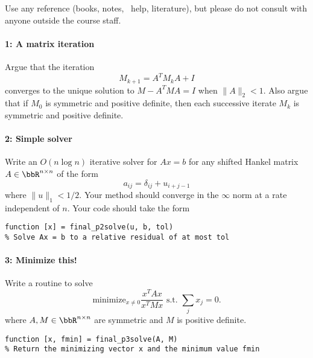 \documentclass[12pt, leqno]{article} %
\begin{document}

Use any reference (books, notes, \matlab\ help, literature),
but please do not consult with anyone outside the course staff.

\paragraph*{1: A matrix iteration}
Argue that the iteration
\[
  M_{k+1} = A^T M_k A + I
\]
converges to the unique solution to $M - A^T M A = I$ when $\|A\|_2 < 1$.
Also argue that if $M_0$ is symmetric and positive definite,
then each successive iterate $M_k$ is symmetric and positive definite.

\paragraph*{2: Simple solver}
Write an $O(n \log n)$ iterative solver for $Ax = b$
for any shifted Hankel matrix $A \in \bbR^{n \times n}$ of the form
\[
  a_{ij} = \delta_{ij} + u_{i+j-1}
\]
where $\|u\|_1 < 1/2$.  Your method should converge in the
$\infty$ norm at a rate independent of $n$.  Your code should
take the form
\begin{lstlisting}
function [x] = final_p2solve(u, b, tol)
% Solve Ax = b to a relative residual of at most tol
\end{lstlisting}

\paragraph*{3: Minimize this!}
Write a routine to solve
\[
  \mbox{minimize}_{x \neq 0} \frac{x^T A x}{x^T M x}
  \mbox{ s.t. } \sum_j x_j = 0.
\]
where $A, M \in \bbR^{n \times n}$ are symmetric and
$M$ is positive definite.
\begin{lstlisting}
function [x, fmin] = final_p3solve(A, M)
% Return the minimizing vector x and the minimum value fmin
\end{lstlisting}
\end{document}
